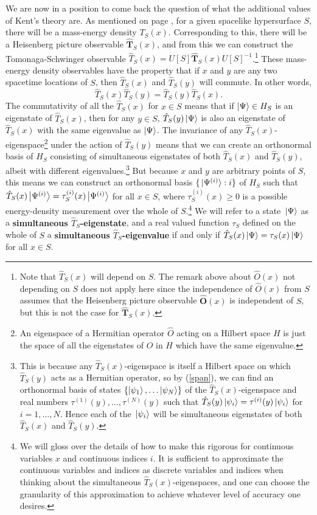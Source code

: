 We are now in a position to come back the question of what the additional values of Kent's theory are. As mentioned on page \pageref{massenergydensity}, for a given spacelike hypersurface $S$,  there will be a mass-energy density $T_S(x)$. Corresponding to this, there will be a Heisenberg picture observable $\hat{\bm{T}}_S(x)$, and from this we can construct the Tomonaga-Schwinger observable $\hat{T}_S(x)=U[S]\hat{\bm{T}}_S(x)U[S]^{-1}$.\footnote{Note that $\hat{T}_S(x)$ will depend on $S$. The remark above about $\hat{O}(x)$ not depending on $S$ does not apply here since the independence of $\hat{O}(x)$ from $S$ assumes that the Heisenberg picture observable $\hat{\bm{O}}(x)$ is independent of $S$, but this is not the case for  $\hat{\bm{T}}_S(x)$. } These mass-energy density observables have the property that if $x$ and $y$ are any two spacetime locations of $S$, then $\hat{T}_S(x)$ and $\hat{T}_S(y)$ will commute. In other words,
$$\hat{T}_S(x)\hat{T}_S(y)=\hat{T}_S(y)\hat{T}_S(x).$$
The commutativity of all the $\hat{T}_S(x)$ for $x\in S$ means that if $\ket{\Psi}\in H_S$ is an eigenstate of $\hat{T}_S(x)$, then for any $y\in S$, $\hat{T}_S(y)\ket{\Psi}$ is also an eigenstate of  $\hat{T}_S(x)$ with the same eigenvalue as $\ket{\Psi}$. The invariance of any $\hat{T}_S(x)$-eigenspace\footnote{An eigenspace of a Hermitian operator $\hat{O}$ acting on a Hilbert space $H$ is just the space of all the eigenstates of $\hat{O}$ in $H$ which have the same eigenvalue.} under the action of   $\hat{T}_S(y)$ means that we can create an orthonormal basis of $H_S$ consisting of simultaneous eigenstates of both  $\hat{T}_S(x)$ and  $\hat{T}_S(y)$, albeit with different eigenvalues.\footnote{This is because any $\hat{T}_S(x)$-eigenspace is itself a Hilbert space on which $\hat{T}_S(y)$ acts as a Hermitian operator, so by (\ref{span}), we can find an orthonormal basis of states $\{\ket{\psi_1},\ldots\ket{\psi_N}\}$ of the $\hat{T}_S(x)$-eigenspace and real numbers $\tau^{(1)}(y),\ldots,\tau^{(N)}(y)$ such that $\hat{T}_S(y)\ket*{\psi_i}=\tau^{(i)}(y)\ket*{\psi_i}$ for $i=1,\ldots,N.$ Hence each of the $\ket*{\psi_i}$ will be simultaneous eigenstates of both $\hat{T}_S(x)$ and $\hat{T}_S(y)$.} But because $x$ and $y$ are arbitrary points of $S$, this means  we can construct an orthonormal basis $\{\ket*{\Psi^{(i)}}:i\}$ of $H_S$ such that
  $\hat{T}_S(x)\ket{\Psi^{(i)}}=\tau^{(i)}_S(x)\ket{\Psi^{(i)}}$ for all $x\in S$, where $\tau^{(i)}_S(x)\geq 0$ is a possible energy-density measurement over the whole of $S$.\footnote{We will gloss over \label{glosssim}the details of how to make this rigorous for continuous variables $x$ and continuous indices $i$. It is sufficient to approximate the continuous variables and indices as discrete variables and indices when thinking about the simultaneous $\hat{T}_S(x)$-eigenspaces, and one can choose the granularity of this approximation to achieve whatever level of accuracy one desires.}\label{simultaneous} We will refer to a state $\ket*{\Psi}$ as a \textbf{simultaneous $\hat{T}_S$-eigenstate}, and a real valued function $\tau_S$ defined on the whole of $S$ a  \textbf{simultaneous $\hat{T}_S$-eigenvalue} if and only if $\hat{T}_S(x)\ket*{\Psi}=\tau_S(x)\ket*{\Psi}$ for all $x\in S$.

